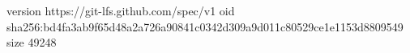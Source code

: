 version https://git-lfs.github.com/spec/v1
oid sha256:bd4fa3ab9f65d48a2a726a90841c0342d309a9d011c80529ce1e1153d8809549
size 49248
